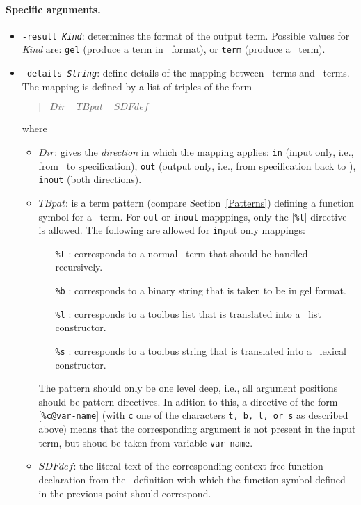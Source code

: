 \paragraph{Specific arguments.}
\begin{itemize}
\item {\tt -result {\em Kind}}: determines the format of the output term.
Possible values for {\em Kind} are: {\tt  gel} (produce a term in \GEL\ format),
or {\tt term} (produce a \TB\ term).

\item {\tt -details {\em String}}: define details of the mapping between
\TB\ terms and \ASFSDF\ terms. The mapping is defined by a list of triples
of the form
\begin{quote}
$Dir~~~~~TBpat~~~~~SDFdef$
\end{quote}
where
\begin{itemize}
\item $Dir$: gives the {\em direction} in which the mapping applies:
{\tt in} (input only, i.e., from \TB\ to specification),
{\tt out} (output only, i.e., from specification back to \TB),
{\tt inout} (both directions).
\item $TBpat$: is a term pattern (compare Section~\ref{Patterns}) defining
a function symbol for a \TB\ term. For {\tt out} or {\tt inout} mapppings,
only the [{\tt \%t}] directive is allowed. The following  are
allowed for {\tt in}put only mappings:
  \begin{itemize}
    \item [{\tt \%t}]: corresponds to a normal \TB\ term that should be handled
          recursively.
    \item [{\tt \%b}]: corresponds to a binary string that is taken to be
          in gel format.
    \item [{\tt \%l}]: corresponds to a toolbus list that is translated into
          a \ASFSDF\ list constructor.
    \item [{\tt \%s}]: corresponds to a toolbus string that is translated into
          a \ASFSDF\ lexical constructor.
  \end{itemize}
  The pattern should only be one level deep, i.e., all argument positions
  should be pattern directives.
  In adition to this, a directive of the form [{\tt \%c@var-name}] (with {\tt c}
  one of the characters {\tt t, b, l, or s} as described above) means
  that the corresponding argument is not present in the input term, but
  shoud be taken from variable {\tt var-name}.

  \item $SDFdef$: the literal text of the corresponding context-free function
  declaration from the \ASFSDF\ definition with which the function symbol
  defined in the previous point should correspond.
  \end{itemize}
\end{itemize}
